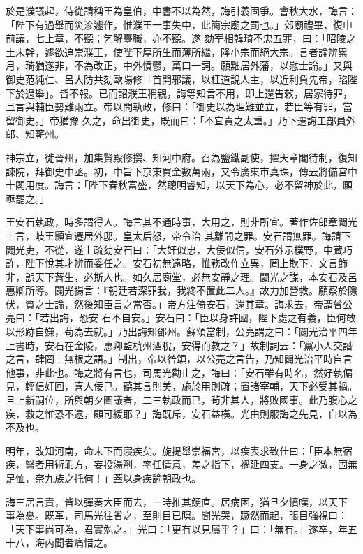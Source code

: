 \begin{pinyinscope}
 於是濮議起，侍從請稱王為皇伯，中書不以為然，誨引義固爭。會秋大水，誨言：「陛下有過舉而災沴遽作，惟濮王一事失中，此簡宗廟之罰也。」郊廟禮畢，復申前議，七上章，不聽；乞解臺職，亦不聽。遂
 劾宰相韓琦不忠五罪，曰：「昭陵之土未幹，遽欲追崇濮王，使陛下厚所生而薄所繼，隆小宗而絕大宗。言者論辨累月，琦猶遂非，不為改正，中外憤鬱，萬口一詞。願黜居外藩，以慰士論。」又與御史范純仁、呂大防共劾歐陽修「首開邪議，以枉道說人主，以近利負先帝，陷陛下於過舉」。皆不報。已而詔濮王稱親，誨等知言不用，即上還告敕，居家待罪，且言與輔臣勢難兩立。帝以問執政，修曰：「御史以為理難並立，若臣等有罪，當留御史。」帝猶豫
 久之，命出御史，既而曰：「不宜責之太重。」乃下遷誨工部員外郎、知蘄州。



 神宗立，徙晉州，加集賢殿修撰、知河中府。召為鹽鐵副使，擢天章閣待制，復知諫院，拜御史中丞。初，中旨下京東買金數萬兩，又令廣東市真珠，傳云將備宮中十閣用度。誨言：「陛下春秋富盛，然聰明睿知，以天下為心，必不留神於此，願亟罷之。」



 王安石執政，時多謂得人。誨言其不通時事，大用之，則非所宜。著作佐郎章闢光上言，岐王顥宜遷居外邸。皇太后怒，帝令治
 其離間之罪。安石謂無罪。誨請下闢光吏，不從，遂上疏劾安石曰：「大奸似忠，大佞似信，安石外示樸野，中藏巧詐，陛下悅其才辨而委任之。安石初無遠略，惟務改作立異，罔上欺下，文言飾非，誤天下蒼生，必斯人也。如久居廟堂，必無安靜之理。闢光之謀，本安石及呂惠卿所導。闢光揚言：『朝廷若深罪我，我終不置此二人。』故力加營救。願察於隱伏，質之士論，然後知臣言之當否。」帝方注倚安石，還其章。誨求去，帝謂曾公亮曰：「若出誨，恐安
 石不自安。」安石曰：「臣以身許國，陛下處之有義，臣何敢以形跡自嫌，茍為去就。」乃出誨知鄧州。蘇頌當制，公亮謂之曰：「闢光治平四年上書時，安石在金陵，惠卿監杭州酒稅，安得而教之？」故制詞云：「黨小人交譖之言，肆罔上無根之語。」制出，帝以咎頌，以公亮之言告，乃知闢光治平時自言他事，非此也。誨之將有言也，司馬光勸止之，誨曰：「安石雖有時名，然好執偏見，輕信奸回，喜人佞己。聽其言則美，施於用則疏；置諸宰輔，天下必受其禍。
 且上新嗣位，所與朝夕圖議者，二三執政而已，茍非其人，將敗國事。此乃腹心之疾，救之惟恐不逮，顧可緩耶？」誨既斥，安石益橫。光由則服誨之先見，自以為不及也。



 明年，改知河南，命未下而寢疾矣。旋提舉崇福宮，以疾表求致仕曰：「臣本無宿疾，醫者用術乖方，妄投湯劑，率任情意，差之指下，禍延四支。一身之微，固無足恤，奈九族之托何！」蓋以身疾諭朝政也。



 誨三居言責，皆以彈奏大臣而去，一時推其鯁直。居病困，猶旦夕憤嘆，以天下
 事為憂。既革，司馬光往省之，至則目已瞑。聞光哭，蹶然而起，張目強視曰：「天下事尚可為，君實勉之。」光曰：「更有以見屬乎？」曰：「無有。」遂卒，年五十八，海內聞者痛惜之。




\end{pinyinscope}
